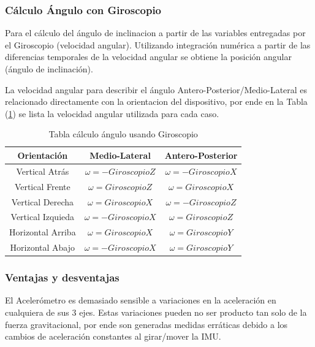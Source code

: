 \documentclass[12pt,a4paper]{article}
\begin{document}
\subsubsection{Cálculo Ángulo con Giroscopio}
Para el cálculo del ángulo de inclinacion a partir de las variables entregadas por el Giroscopio (velocidad angular). Utilizando integración numérica a partir de las diferencias temporales de la velocidad angular se obtiene la posición angular (ángulo de inclinación).

La velocidad angular para describir el ángulo Antero-Posterior/Medio-Lateral es relacionado directamente con la orientacion del dispositivo, por ende en la Tabla (\ref{table:calculoAnguloGiroscopio}) se lista la velocidad angular utilizada para cada caso.



\begin{table}[H]
	\centering
	\begin{tabular}{|c|c|c|}
		\hline 
		\textbf{Orientación} & \textbf{Medio-Lateral} & \textbf{Antero-Posterior} \\ 
		\hline 
		Vertical Atrás & $\omega= -GiroscopioZ$ &  $\omega= -GiroscopioX$ \\ 
		\hline 
		Vertical Frente & $\omega= GiroscopioZ$ &  $\omega= GiroscopioX$ \\
		\hline 
		Vertical Derecha & $\omega= GiroscopioX$ &  $\omega= -GiroscopioZ$ \\ 
		\hline 
		Vertical Izquieda & $\omega= -GiroscopioX$ &  $\omega= GiroscopioZ$ \\ 
		\hline 
		Horizontal Arriba & $\omega= GiroscopioX$ &  $\omega= GiroscopioY$ \\ 
		\hline 
		Horizontal Abajo & $\omega= -GiroscopioX$ &  $\omega= GiroscopioY$ \\ 
		\hline 
	\end{tabular}
	\caption{Tabla cálculo ángulo usando Giroscopio} 
	\label{table:calculoAnguloGiroscopio}
\end{table}



\subsubsection{Ventajas y desventajas}

El Acelerómetro es demasiado sensible a variaciones en la aceleración en cualquiera de sus 3 ejes. Estas variaciones pueden no ser producto tan solo de la fuerza gravitacional, por ende son generadas medidas erráticas debido a los cambios de aceleración constantes al girar/mover la IMU.
\end{document}
